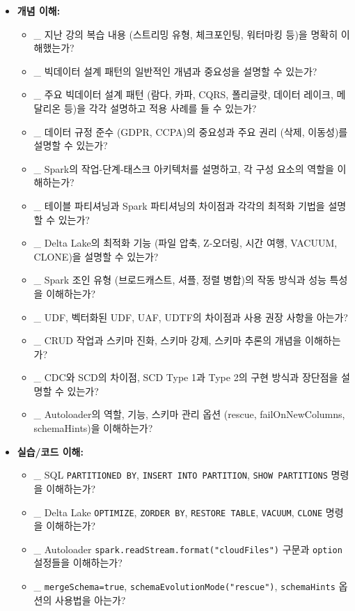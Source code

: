\documentclass[11pt,a4paper]{article}
\theoremstyle{definition}
\begin{document}
\begin{itemize}
    \item \textbf{개념 이해:}
    \begin{itemize}
        \item \_ 지난 강의 복습 내용 (스트리밍 유형, 체크포인팅, 워터마킹 등)을 명확히 이해했는가?
        \item \_ 빅데이터 설계 패턴의 일반적인 개념과 중요성을 설명할 수 있는가?
        \item \_ 주요 빅데이터 설계 패턴 (람다, 카파, CQRS, 폴리글랏, 데이터 레이크, 메달리온 등)을 각각 설명하고 적용 사례를 들 수 있는가?
        \item \_ 데이터 규정 준수 (GDPR, CCPA)의 중요성과 주요 권리 (삭제, 이동성)를 설명할 수 있는가?
        \item \_ Spark의 작업-단계-태스크 아키텍처를 설명하고, 각 구성 요소의 역할을 이해하는가?
        \item \_ 테이블 파티셔닝과 Spark 파티셔닝의 차이점과 각각의 최적화 기법을 설명할 수 있는가?
        \item \_ Delta Lake의 최적화 기능 (파일 압축, Z-오더링, 시간 여행, VACUUM, CLONE)을 설명할 수 있는가?
        \item \_ Spark 조인 유형 (브로드캐스트, 셔플, 정렬 병합)의 작동 방식과 성능 특성을 이해하는가?
        \item \_ UDF, 벡터화된 UDF, UAF, UDTF의 차이점과 사용 권장 사항을 아는가?
        \item \_ CRUD 작업과 스키마 진화, 스키마 강제, 스키마 추론의 개념을 이해하는가?
        \item \_ CDC와 SCD의 차이점, SCD Type 1과 Type 2의 구현 방식과 장단점을 설명할 수 있는가?
        \item \_ Autoloader의 역할, 기능, 스키마 관리 옵션 (rescue, failOnNewColumns, schemaHints)을 이해하는가?
    \end{itemize}
    \item \textbf{실습/코드 이해:}
    \begin{itemize}
        \item \_ SQL \texttt{PARTITIONED BY}, \texttt{INSERT INTO PARTITION}, \texttt{SHOW PARTITIONS} 명령을 이해하는가?
        \item \_ Delta Lake \texttt{OPTIMIZE}, \texttt{ZORDER BY}, \texttt{RESTORE TABLE}, \texttt{VACUUM}, \texttt{CLONE} 명령을 이해하는가?
        \item \_ Autoloader \texttt{spark.readStream.format("cloudFiles")} 구문과 \texttt{option} 설정들을 이해하는가?
        \item \_ \texttt{mergeSchema=true}, \texttt{schemaEvolutionMode("rescue")}, \texttt{schemaHints} 옵션의 사용법을 아는가?

\end{itemize}
\end{itemize}
\end{document}
